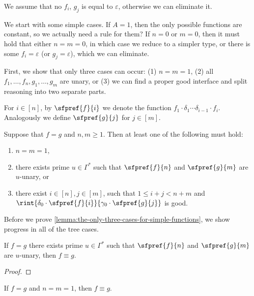 We assume that no $f_i$, $g_j$ is equal to $\varepsilon$, otherwise we can eliminate it.

We start with some simple cases. If $A = 1$, then the only possible functions are constant, so we actually need a rule for them?  If $n = 0$ or $m = 0$, then it must hold that either $n = m = 0$, in which case we reduce to a simpler type, or there is some $f_i = \varepsilon$ (or $g_j = \varepsilon$), which we can eliminate.

First, we show that only three cases can occur: (1) $n = m = 1$, (2) all $f_1, \dots, f_n,g_1, \dots, g_m$ are unary, or (3) we can find a proper good interface and split reasoning into two separate parts. 

For $i \in [n]$, by $\sfpref{f}{i}$ we denote the function $f_1 \cdot \delta_1 \cdots \delta_{i-1} \cdot f_i$. Analogously we define $\sfpref{g}{j}$ for $j \in [m]$.

\begin{lemma}\label{lemma:the-only-three-cases-for-simple-functions}
    Suppose that $f = g$ and $n, m \geq 1$. Then at least one of the following must hold:
    \begin{enumerate}
        \item $n = m = 1$,
        \item there exists prime $u \in \Gamma^*$ such that $\sfpref{f}{n}$ and $\sfpref{g}{m}$ are $u$-unary, or
        \item there exist $i \in [n], j \in [m]$, such that $1 \leq i + j < n+m$ and $\rint{\delta_0 \cdot \sfpref{f}{i}}{\gamma_0 \cdot \sfpref{g}{j}}$ is good.
    \end{enumerate}
\end{lemma}

Before we prove \cref{lemma:the-only-three-cases-for-simple-functions}, we show progress in all of the tree cases.

\begin{claim}\label{claim:progress_for_unary}
    If $f = g$ there exists prime $u \in \Gamma^*$ such that $\sfpref{f}{n}$ and $\sfpref{g}{m}$ are $u$-unary, then $f \equiv g$. 
\end{claim}

\begin{proof}
\end{proof}

\begin{claim}\label{claim:progress_for_one_bihom_in_both_functions}
    If $f = g$ and $n = m = 1$, then $f \equiv g$.
\end{claim}

